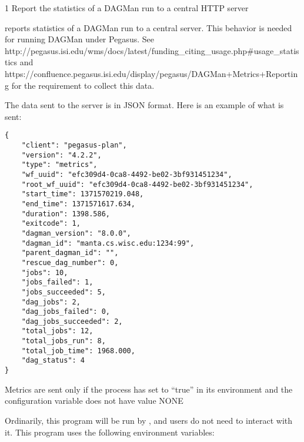 \begin{ManPage}{\label{man-condor-dagman-metrics-reporter}}{1}
{Report the statistics of a DAGMan run to a central HTTP server}
\Synopsis {}


\Description

 reports statistics of a DAGMan run to a
central server.  This behavior is needed for running DAGMan under Pegasus.  See
http://pegasus.isi.edu/wms/docs/latest/funding\_citing\_usage.php\#usage\_statistics
and https://confluence.pegasus.isi.edu/display/pegasus/DAGMan+Metrics+Reporting
for the requirement to collect this data.

The data sent to the server is in JSON format.  Here is an example of what is sent:
\begin{verbatim}
{
    "client": "pegasus-plan",
    "version": "4.2.2",
    "type": "metrics",
    "wf_uuid": "efc309d4-0ca8-4492-be02-3bf931451234",
    "root_wf_uuid": "efc309d4-0ca8-4492-be02-3bf931451234",
    "start_time": 1371570219.048,
    "end_time": 1371571617.634,
    "duration": 1398.586,
    "exitcode": 1,
    "dagman_version": "8.0.0",
    "dagman_id": "manta.cs.wisc.edu:1234:99",
    "parent_dagman_id": "",
    "rescue_dag_number": 0,
    "jobs": 10,
    "jobs_failed": 1,
    "jobs_succeeded": 5,
    "dag_jobs": 2,
    "dag_jobs_failed": 0,
    "dag_jobs_succeeded": 2,
    "total_jobs": 12,
    "total_jobs_run": 8,
    "total_job_time": 1968.000,
    "dag_status": 4
}
\end{verbatim}

Metrics are sent only if the  process has
 set to ``true'' in its environment and the
 configuration variable does not have value NONE

Ordinarily, this program will be run by , and users do not need to interact with it.
This program uses the following environment variables:
\begin{Options}
\end{Options}


\end{ManPage}

